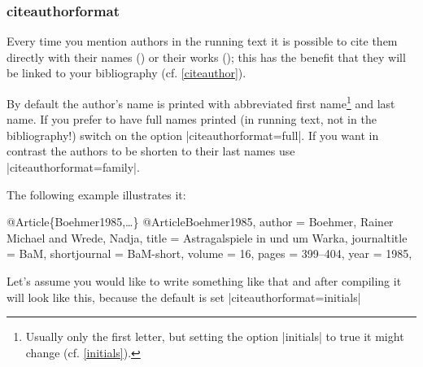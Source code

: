 \documentclass[a4paper,
10pt,
greek,
french,
spanish,
italian,
ngerman,
english
]{ltxdoc}
\begin{document}
\subsubsection{citeauthorformat}\label{citeauthorformat}
Every time you mention authors in the running text it is possible to cite them 
directly with their names () or their works  ();
this has the benefit that they will be linked to your bibliography (cf. \cref{citeauthor}).

By default the author's name is printed with abbreviated first name\footnote{Usually only the first letter, but setting the option |initials| to true it might change (cf. \cref{initials}).} and last name.
If you prefer to have full names printed (in running text, not in the bibliography!) switch on the option |citeauthorformat=full|.
If you want in contrast the authors to be shorten to their last names use |citeauthorformat=family|.

The following example illustrates it:

\begin{bibexample}[label=Boehmer1985]{{@}Article\{Boehmer1985,…\}}
@Article{Boehmer1985,
  author       = {Boehmer, Rainer Michael and Wrede, Nadja},
  title        = {Astragalspiele in und um Warka},
  journaltitle = BaM,
  shortjournal = BaM-short,
  volume       = {16},
  pages        = {399--404},
  year         = {1985},
}
\end{bibexample}

Let's assume you would like to write something like that and
after compiling it will look like this, 
because the default is set  |citeauthorformat=initials| 
\end{document}
